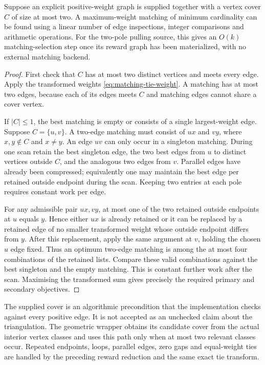 \begin{theorem}
\label{thm:two-pole-linear-matching}
Suppose an explicit positive-weight graph is supplied together with
a vertex cover $C$ of size at most two. A maximum-weight matching
of minimum cardinality can be found using a linear number of edge
inspections, integer comparisons and arithmetic operations. For
the two-pole pulling source, this gives an $O(k)$ matching-selection
step once its reward graph has been materialized, with no external
matching backend.
\end{theorem}
\begin{proof}
First check that $C$ has at most two distinct vertices and meets
every edge. Apply the transformed weights
\eqref{eq:matching-tie-weight}. A matching has at most two edges,
because each of its edges meets $C$ and matching edges cannot
share a cover vertex.

If $|C|\le1$, the best matching is empty or consists of a single
largest-weight edge. Suppose $C=\{u,v\}$. A two-edge matching must
consist of $ux$ and $vy$, where $x,y\notin C$ and $x\ne y$.
An edge $uv$ can only occur in a singleton matching. During one
scan retain the best singleton edge, the two best edges from
$u$ to distinct vertices outside $C$, and the analogous two
edges from $v$. Parallel edges have already been compressed;
equivalently one may maintain the best edge per retained outside
endpoint during the scan. Keeping two entries at each pole
requires constant work per edge.

For any admissible pair $ux,vy$, at most one of the two retained
outside endpoints at $u$ equals $y$. Hence either $ux$ is already
retained or it can be replaced by a retained edge of no smaller
transformed weight whose outside endpoint differs from $y$.
After this replacement, apply the same argument at $v$, holding
the chosen $u$ edge fixed. Thus an optimum two-edge matching is
among the at most four combinations of the retained lists.
Compare these valid combinations against the best singleton
and the empty matching. This is constant further work after
the scan. Maximising the transformed sum gives precisely the
required primary and secondary objectives.
\end{proof}

The supplied cover is an algorithmic precondition that the
implementation checks against every positive edge. It is not
accepted as an unchecked claim about the triangulation. The
geometric wrapper obtains its candidate cover from the actual
interior vertex classes and uses this path only when at most
two relevant classes occur. Repeated endpoints, loops, parallel
edges, zero gaps and equal-weight ties are handled by the
preceding reward reduction and the same exact tie transform.

